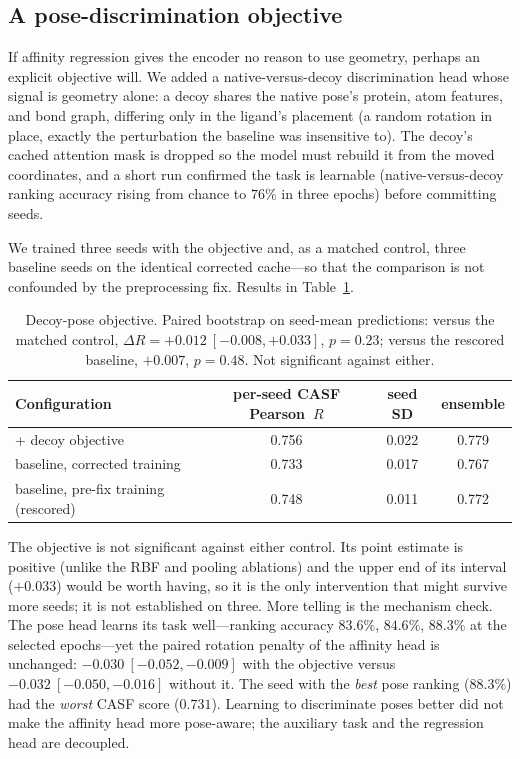 \documentclass[11pt]{article}
\newcommand{\pearson}{Pearson~$R$}
\begin{document}
\subsection{A pose-discrimination objective}
\label{sec:decoy}

If affinity regression gives the encoder no reason to use geometry, perhaps an explicit
objective will. We added a native-versus-decoy discrimination head whose signal is
geometry alone: a decoy shares the native pose's protein, atom features, and bond graph,
differing only in the ligand's placement (a random rotation in place, exactly the
perturbation the baseline was insensitive to). The decoy's cached attention mask is dropped
so the model must rebuild it from the moved coordinates, and a short run confirmed the task
is learnable (native-versus-decoy ranking accuracy rising from chance to $76\%$ in three
epochs) before committing seeds.

We trained three seeds with the objective and, as a matched control, three baseline seeds on
the identical corrected cache---so that the comparison is not confounded by the preprocessing
fix. Results in Table~\ref{tab:decoy}.

\begin{table}[t]
\centering
\begin{tabular}{lccc}
\toprule
Configuration & per-seed CASF \pearson{} & seed SD & ensemble \\
\midrule
+ decoy objective                 & 0.756 & 0.022 & 0.779 \\
baseline, corrected training       & 0.733 & 0.017 & 0.767 \\
baseline, pre-fix training (rescored) & 0.748 & 0.011 & 0.772 \\
\bottomrule
\end{tabular}
\caption{Decoy-pose objective. Paired bootstrap on seed-mean predictions: versus the
matched control, $\Delta R = +0.012\ [-0.008, +0.033]$, $p=0.23$; versus the rescored
baseline, $+0.007$, $p=0.48$. Not significant against either.}
\label{tab:decoy}
\end{table}

The objective is not significant against either control. Its point estimate is positive
(unlike the RBF and pooling ablations) and the upper end of its interval ($+0.033$) would be
worth having, so it is the only intervention that might survive more seeds; it is not
established on three. More telling is the mechanism check. The pose head learns its task
well---ranking accuracy $83.6\%$, $84.6\%$, $88.3\%$ at the selected epochs---yet the paired
rotation penalty of the affinity head is unchanged: $-0.030\ [-0.052, -0.009]$ with the
objective versus $-0.032\ [-0.050, -0.016]$ without it. The seed with the \emph{best} pose
ranking ($88.3\%$) had the \emph{worst} CASF score ($0.731$). Learning to discriminate poses
better did not make the affinity head more pose-aware; the auxiliary task and the regression
head are decoupled.
\end{document}

